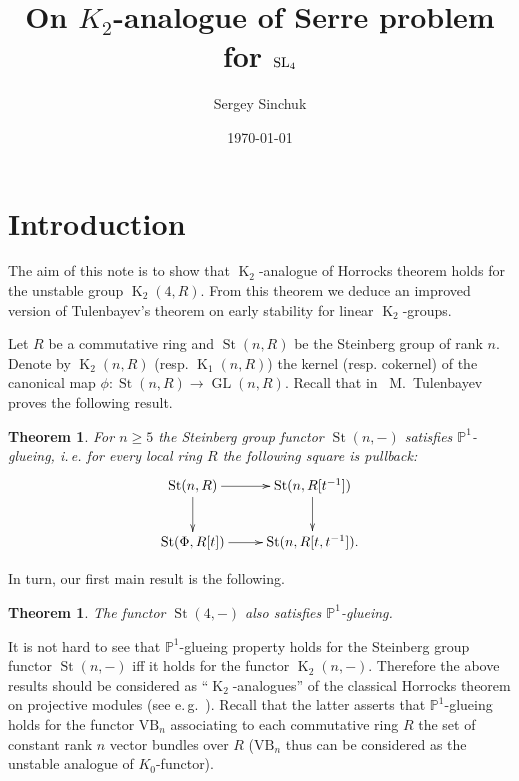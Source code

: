 \documentclass[oneside, 10pt]{amsart}
\title{On $K_2$-analogue of Serre problem for $\operatorname{SL}_4$}
\author {Sergey Sinchuk}
\date {\today}
\DeclareMathOperator{\St}{St}
\DeclareMathOperator{\GL}{GL}
\DeclareMathOperator{\K}{K}
\newtheorem{thm}{Theorem}
\numberwithin{equation}{section}
\numberwithin{lemma}{section}
\newtheorem*{thm*}{Theorem}
\theoremstyle{definition}
\theoremstyle{remark}
\begin{document}
   
\maketitle

\section{Introduction}

The aim of this note is to show that $\K_2$-analogue of Horrocks theorem holds for the unstable group $\K_2(4, R)$.
From this theorem we deduce an improved version of Tulenbayev's theorem on early stability for linear $\K_2$-groups.

Let $R$ be a commutative ring and $\St(n, R)$ be the Steinberg group of rank $n$.
Denote by $\K_2(n, R)$ (resp. $\K_1(n, R)$) the kernel (resp. cokernel) of the canonical map $\phi\colon \St(n, R) \to \GL(n, R)$.
Recall that in~\cite[Theorem~5.1]{Tu83} M.~Tulenbayev proves the following result.
\begin{thm*} For $n \geq 5$ the Steinberg group functor $\St(n, -)$ satisfies $\mathbb{P}^1$-glueing, i.\,e. for every
 local ring $R$ the following square is pullback:
 \[\xymatrix{ \St(n, R)    \ar[r]\ar[d] & \ar[d] \St(n, R[t^{-1}]) \\ 
              \St(\Phi, R[t]) \ar[r]       &        \St(n, R[t, t^{-1}]).}\]
\end{thm*}
In turn, our first main result is the following.
\begin{thm} \label{thm:horrocks-sl4} The functor $\St(4, -)$ also satisfies $\mathbb{P}^1$-glueing. \end{thm}

It is not hard to see that $\mathbb{P}^1$-glueing property holds for the Steinberg group functor $\St(n, -)$ iff it holds for the functor $\K_2(n, -)$.
Therefore the above results should be considered as ``$\K_2$-analogues'' of the classical Horrocks theorem on projective modules (see e.\,g.~\cite[Ch.~IV]{Lam10}).
Recall that the latter asserts that $\mathbb{P}^1$-glueing holds for the functor $\mathrm{VB}_n$ associating to each commutative ring $R$
 the set of constant rank $n$ vector bundles over $R$ ($\mathrm{VB}_n$ thus can be considered as the unstable analogue of $K_0$-functor).
\end{document}
